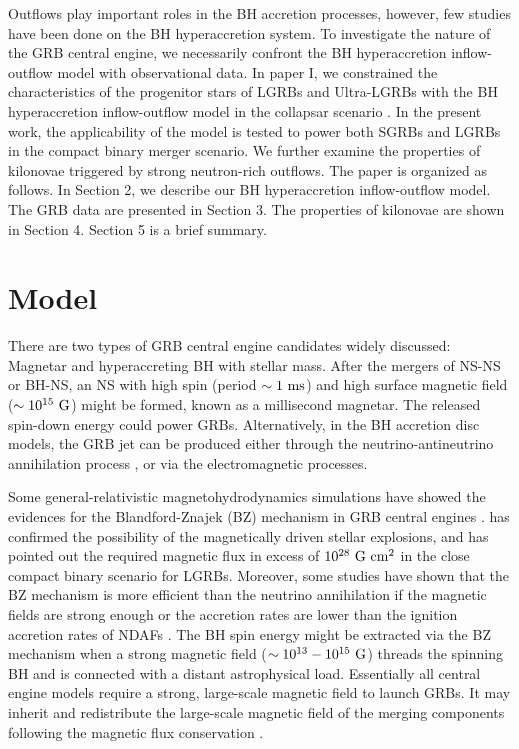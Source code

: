 \documentclass[a4paper,fleqn,usenatbib]{mnras}
\begin{document}
Outflows play important roles in the BH accretion processes, however, few studies have been done on the BH hyperaccretion system. To investigate the nature of the GRB central engine, we necessarily confront the BH hyperaccretion inflow-outflow model with observational data. In paper I, we constrained the characteristics of the progenitor stars of LGRBs and Ultra-LGRBs with the BH hyperaccretion inflow-outflow model in the collapsar scenario \citep{Liu2018}. In the present work, the applicability of the model is tested to power both SGRBs and LGRBs in the compact binary merger scenario. We further examine the properties of kilonovae triggered by strong neutron-rich outflows. The paper is organized as follows. In Section 2, we describe our BH hyperaccretion inflow-outflow model. The GRB data are presented in Section 3. The properties of kilonovae are shown in Section 4. Section 5 is a brief summary.

\section{Model}

There are two types of GRB central engine candidates widely discussed: Magnetar and hyperaccreting BH with stellar mass. After the mergers of NS-NS or BH-NS, an NS with high spin (period $\sim1~ \rm ms$) and high surface magnetic field ($\sim10^{15}~\rm G$) might be formed, known as a millisecond magnetar. The released spin-down energy could power GRBs. Alternatively, in the BH accretion disc models, the GRB jet can be produced either through the neutrino-antineutrino annihilation process \citep[see e.g.,][]{Popham1999,Di2002,Narayan2001,Liu2007}, or via the electromagnetic processes.

Some general-relativistic magnetohydrodynamics simulations have showed the evidences for the Blandford-Znajek (BZ) mechanism \citep[][]{Blandford1977,Blandford1977a} in GRB central engines \citep[e.g .,][]{Nagataki2009,Tchekhovskoy2012}. \citet{Barkov2010} has confirmed the possibility of the magnetically driven stellar explosions, and has pointed out the required magnetic flux in excess of $10^{28}~\rm G~cm^{2}$ in the close compact binary scenario for LGRBs. Moreover, some studies have shown that the BZ mechanism is more efficient than the neutrino annihilation if the magnetic fields are strong enough or the accretion rates are lower than the ignition accretion rates of NDAFs \citep[e.g.,][]{Kawanaka2013,Liu2015a,Lei2017,Liu2017a}. The BH spin energy might be extracted via the BZ mechanism when a strong magnetic field ($\sim10^{13}-10^{15} ~\rm G$) threads the spinning BH and is connected with a distant astrophysical load. Essentially all central engine models require a strong, large-scale magnetic field to launch GRBs. It may inherit and redistribute the large-scale magnetic field of the merging components following the magnetic flux conservation \citep[e.g.,][]{Liu2016,Punsly2016}.
\end{document}
